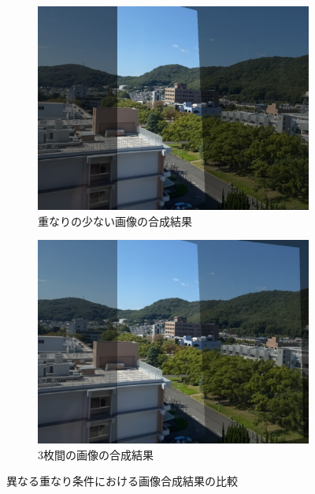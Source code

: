 \documentclass[autodetect-engine,dvi=dvipdfmx,ja=standard,
               a4j,11pt]{bxjsarticle}
\begin{document}
\begin{figure}[h]
 \centering
 \begin{subfigure}[b]{0.45\textwidth}
   \centering
   \includegraphics[scale=0.2]{3.2-mypicture-m2d.jpg}
   \caption{重なりの少ない画像の合成結果}
   \label{fig:3.2-mypicture-m2d.jpg}
 \end{subfigure}
 \hspace{5mm}
 \begin{subfigure}[b]{0.45\textwidth}
   \centering
   \includegraphics[scale=0.2]{3.2-mypicture-m1dm2d.jpg}
   \caption{3枚間の画像の合成結果}
   \label{fig:3.2-mypicture-m1dm2d.jpg}
 \end{subfigure}
 \caption{異なる重なり条件における画像合成結果の比較}
 \label{fig:comparison_m1dm2d}
\end{figure}
\end{document}
